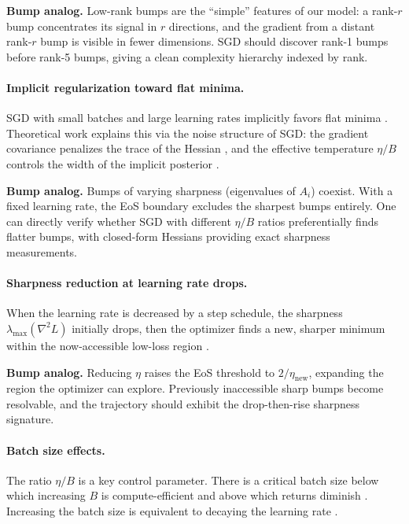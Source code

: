 \documentclass{article}
\begin{document}
\textbf{Bump analog.} Low-rank bumps are the ``simple'' features of our
model: a rank-$r$ bump concentrates its signal in $r$ directions, and
the gradient from a distant rank-$r$ bump is visible in fewer
dimensions. SGD should discover rank-1 bumps before rank-5 bumps, giving
a clean complexity hierarchy indexed by rank.

\paragraph{Implicit regularization toward flat minima.}
SGD with small batches and large learning rates implicitly favors flat
minima \cite{hochreiter1997flat,keskar2017large}. Theoretical work
explains this via the noise structure of SGD: the gradient covariance
penalizes the trace of the Hessian
\cite{blanc2020implicit,damian2021label}, and the effective temperature
$\eta/B$ controls the width of the implicit posterior
\cite{smith2018bayesian}.

\textbf{Bump analog.} Bumps of varying sharpness (eigenvalues of $A_i$)
coexist. With a fixed learning rate, the EoS boundary excludes the
sharpest bumps entirely. One can directly verify whether SGD with
different $\eta/B$ ratios preferentially finds flatter bumps, with
closed-form Hessians providing exact sharpness measurements.

\paragraph{Sharpness reduction at learning rate drops.}
When the learning rate is decreased by a step schedule, the sharpness
$\lambda_{\max}(\nabla^2 L)$ initially drops, then the optimizer finds
a new, sharper minimum within the now-accessible low-loss region
\cite{lewkowycz2020large,cohen2021gradient}.

\textbf{Bump analog.} Reducing $\eta$ raises the EoS threshold to
$2/\eta_{\text{new}}$, expanding the region the optimizer can explore.
Previously inaccessible sharp bumps become resolvable, and the
trajectory should exhibit the drop-then-rise sharpness signature.

\paragraph{Batch size effects.}
The ratio $\eta/B$ is a key control parameter. There is a critical batch
size below which increasing $B$ is compute-efficient and above which
returns diminish \cite{mccandlish2018empirical}. Increasing the batch
size is equivalent to decaying the learning rate
\cite{goyal2017accurate}.
\end{document}
